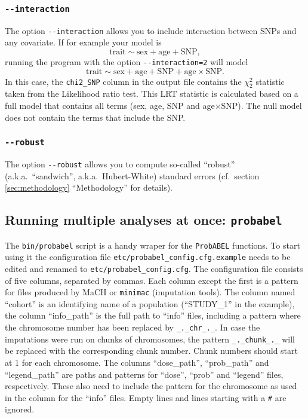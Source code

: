 \documentclass[12pt,a4paper]{article}
\newcommand{\PA}{\texttt{ProbABEL}}
\begin{document}
\subsubsection{\lstinline{--interaction}}
\label{sec:interaction}
The option \lstinline{--interaction} allows you to include interaction
between SNPs and any covariate. If for example your model is
\begin{equation*}
  \textrm{trait} \sim \textrm{sex} + \textrm{age} + \textrm{SNP},
\end{equation*}
running the program with the option \lstinline{--interaction=2} will model
\begin{equation*}
  \textrm{trait} \sim \textrm{sex} + \textrm{age} + \textrm{SNP} +
  \textrm{age} \times \mathrm{SNP}.
\end{equation*}
In this case, the \lstinline{chi2_SNP} column in the output file contains
the $\chi_2^2$ statistic taken from the Likelihood ratio test. This
LRT statistic is calculated based on a full model that contains all
terms (sex, age, SNP and age$\times$SNP). The null model does not
contain the terms that include the SNP.


\subsubsection{\lstinline{--robust}}
\label{sec:robust}
The option \lstinline{--robust} allows you to compute so-called
``robust'' (a.k.a.~``sandwich'', a.k.a.~Hubert-White) standard errors
(cf.~section \ref{sec:methodology} ``Methodology'' for details).


\subsection{Running multiple analyses at once: \texttt{probabel}}
The \texttt{bin/probabel} script is a handy wraper for the \PA{}
functions. To start using it the configuration file
\texttt{etc/probabel\_config.cfg.example} needs to be edited and
renamed to \texttt{etc/probabel\_config.cfg}. The configuration file
consists of five columns, separated by commas. Each column except the
first is a pattern for files produced by MaCH or \texttt{minimac}
(imputation tools). The column named ``cohort'' is an identifying name
of a population (``STUDY\_1'' in the example), the column
``info\_path'' is the full path to ``info'' files, including a pattern
where the chromosome number has been replaced by
\texttt{\_.\_chr\_.\_}. In case the imputations were run on chunks of
chromosomes, the pattern \texttt{\_.\_chunk\_.\_} will be replaced
with the corresponding chunk number. Chunk numbers should start at 1
for each chromosome. The columns ``dose\_path'', ``prob\_path'' and
``legend\_path'' are paths and patterns for ``dose'', ``prob'' and
``legend'' files, respectively. These also need to include the pattern
for the chromosome as used in the column for the ``info'' files.
Empty lines and lines starting with a \texttt{\#} are ignored.
\end{document}

